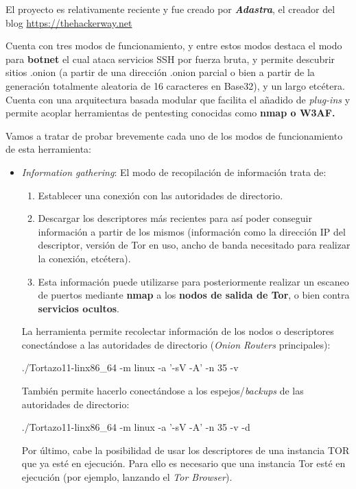 El proyecto es relativamente reciente y fue creado por \textbf{\textit{Adastra}}, el creador del blog \url{https://thehackerway.net}

Cuenta con tres modos de funcionamiento, y entre estos modos destaca el modo para \textbf{botnet} el cual ataca servicios SSH por fuerza bruta, y permite descubrir sitios .onion (a partir de una dirección .onion parcial o bien a partir de la generación totalmente aleatoria de 16 caracteres en Base32), y un largo etcétera. Cuenta con una arquitectura basada modular que facilita el añadido de \textit{plug-ins} y permite acoplar herramientas de pentesting conocidas como \textbf{nmap o W3AF.}

Vamos a tratar de probar brevemente cada uno de los modos de funcionamiento de esta herramienta:

\begin{itemize}
	\item{\textit{Information gathering}}: El modo de recopilación de información trata de:
	\begin{enumerate}
		\item Establecer una conexión con las autoridades de directorio.
		\item Descargar los descriptores más recientes para así poder conseguir información a partir de los mismos (información como  la dirección IP del descriptor, versión de Tor en uso, ancho de banda necesitado para realizar la conexión, etcétera). 
		\item Esta información puede utilizarse para posteriormente realizar un escaneo de puertos mediante \textbf{nmap} a los \textbf{nodos de salida de Tor}, o bien contra \textbf{servicios ocultos}. 
	\end{enumerate}
	
	La herramienta permite recolectar información de los nodos o descriptores conectándose a las autoridades de directorio (\textit{Onion Routers} principales):
	
	{\selectfont 
		./Tortazo11-linx86\_64 -m linux -a '-sV -A' -n 35 -v
	}
	
	También permite hacerlo conectándose a los espejos/\textit{backups} de las autoridades de directorio:
	
	{\selectfont 
		./Tortazo11-linx86\_64 -m linux -a '-sV -A' -n 35 -v -d
	}
	
	Por último, cabe la posibilidad de usar los descriptores de una instancia TOR que ya esté en ejecución. Para ello es necesario que una instancia Tor esté en ejecución (por ejemplo, lanzando el \textit{Tor Browser}).
	

\end{itemize}
